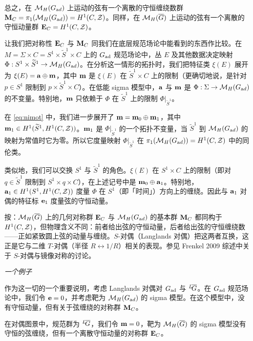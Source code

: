 总之，在 $\MHAD$ 上运动的弦有一个离散的守恒缠绕数群 ${\bf M}_C=\pi_1(\MHAD)=H^1(C,\CZ)$。同样，在 $\MH(\bar G)$ 上运动的弦有一个离散的守恒动量群 ${\bf E}_C=H^1(C,\CZ)$。

让我们把对称性 ${\bf E}_C$ 与 ${\bf M}_C$ 同我们在底层规范场论中能看到的东西作比较。在 $M=\Sigma\times C=S^1\times \tilde S^1\times C$ 上的 $G_{\rm{ad}}$ 规范场论中，丛 $E$ 及其他数据决定映射 $\Phi:S^1\times \tilde S^1\to \MHAD$。在分析这一情形的拓扑时，我们把特征类 $\xi(E)$ 展开为 $\xi(E)={\bf a}\oplus {\bf m}$，其中 ${\bf m}$ 是 $\xi(E)$ 在 $\tilde S^1\times C$ 上的限制（更确切地说，是针对 $p\in S^1$ 限制到 $p\times \tilde S^1\times C$）。在低能 sigma 模型中，${\bf a}$ 与 ${\bf m}$ 是 $\Phi:\Sigma\to \MHAD$ 的不变量。特别地，${\bf m}$ 只依赖于 $\Phi$ 在 $\tilde S^1$ 上的限制 $\Phi|_{\tilde S^1}$。

在 \eqref{eq:nimot} 中，我们进一步展开了 ${\bf m}={\bf m}_0\oplus {\bf m}_1$，其中 ${\bf m}_1\in H^1(\tilde S^1,H^1(C,\CZ))$。${\bf m}_1$ 是 $\Phi|_{\tilde S^1}$ 的一个拓扑不变量，当 $\tilde S^1$ 到 $\MHAD$ 的映射为常值时它为零。所以它度量映射 $\Phi|_{\tilde S^1}$ 在 $\pi_1(\MHAD)=H^1(C,\CZ)$ 中的同伦类。

类似地，我们可以交换 $S^1$ 与 $\tilde S^1$ 的角色。$\xi(E)$ 在 $S^1\times C$ 上的限制（即对 $q\in \tilde S^1$ 限制到 $S^1\times q\times C$），在上述记号中是 ${\bf m}_0\oplus {\bf a}_1$。特别地，${\bf a}_1\in H^1(S^1,H^1(C,\CZ))$ 度量 $\Phi$ 在 $S^1$（即「时间」）方向上的缠绕。因此与 ${\bf a}_1$ 对偶的特征标 ${\bf e}_1$ 度量弦的守恒动量。

\begin{yizhu}[物理图像]
按：$\MH(\bar G)$ 上的几何对称群 ${\bf E}_C$ 与 $\MHAD$ 的基本群 ${\bf M}_C$ 都同构于 $H^1(C,\CZ)$，但物理含义不同：前者给出弦的守恒动量，后者给出弦的守恒缠绕数——正如紧致圆上弦的动量与缠绕。$S$-对偶（Langlands 对偶）把这两者互换，这正是它与二维 $T$-对偶（半径 $R\leftrightarrow 1/R$）相关的表现。参见 Frenkel 2009 综述中关于 $S$-对偶与镜像对称的讨论。
\end{yizhu}

\par\medskip\emph{一个例子}

作为这一切的一个重要说明，考虑 Langlands 对偶对 $G_{\rm{ad}}$ 与 $^L\negthinspace\bar G$。在 $G_{\rm{ad}}$ 规范场论中，我们令 ${\bf e}=0$，并考虑靶为 $\MHAD$ 的 sigma 模型。在这个模型中，没有守恒动量，但有关于弦缠绕的对称群 ${\bf M}_C$。

在对偶图景中，规范群为 $^L\negthinspace\bar G$，我们令 ${\bf m}=0$，靶为 $\MH(\bar G)$ 的 sigma 模型没有守恒的弦缠绕，但有一个离散守恒动量的对称群 ${\bf E}_C$。

